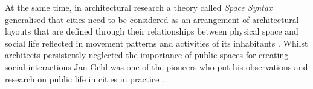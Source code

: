 
At the same time, in architectural research a theory called \textit{Space Syntax} generalised that cities need to be considered as an arrangement of architectural layouts that are defined through their relationships between physical space and social life reflected in movement patterns and activities of its inhabitants \cite{Hillier_1989}.
Whilst architects persistently neglected the importance of public spaces for creating social interactions Jan Gehl was one of the pioneers who put his observations and research on public life in cities in practice \cite{Gehl_2013}. 







